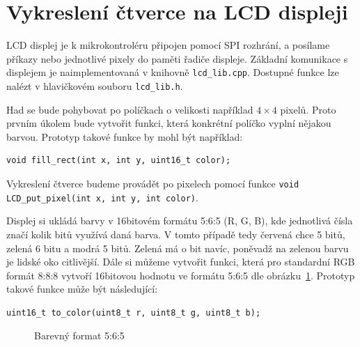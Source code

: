 \documentclass[12pt]{article}
\begin{document}
\section{Vykreslení čtverce na LCD displeji}
LCD displej je k mikrokontroléru připojen pomocí SPI rozhrání, a posílame příkazy nebo jednotlivé pixely do paměti řadiče displeje.
Základní komunikace s displejem je naimplementovaná v knihovně \texttt{lcd\_lib.cpp}.
Dostupné funkce lze nalézt v hlavičkovém souboru \texttt{lcd\_lib.h}.

Had se bude pohybovat po políčkach o velikosti například $4\times4$ pixelů.
Proto prvním úkolem bude vytvořit funkci, která konkrétní políčko vyplní nějakou barvou.
Prototyp takové funkce by mohl být například:
\begin{verbatim}
void fill_rect(int x, int y, uint16_t color);
\end{verbatim}
Vykreslení čtverce budeme provádět po pixelech pomocí funkce \texttt{void LCD_put_pixel(int x, int y, int color)}.

Displej si ukládá barvy v 16bitovém formátu 5:6:5 (R, G, B), kde jednotlivá čísla značí kolik bitů využívá daná barva.
V tomto případě tedy červená chce 5 bitů, zelená 6 bitu a modrá 5 bitů.
Zelená má o bit navíc, poněvadž na zelenou barvu je lidské oko citlivější.
Dále si můžeme vytvořit funkci, která  pro standardní RGB formát 8:8:8 vytvoří 16bitovou hodnotu ve formátu 5:6:5 dle obrázku~\ref{fig:rgb565}.
Prototyp takové funkce může být následující:
\begin{verbatim}
uint16_t to_color(uint8_t r, uint8_t g, uint8_t b);
\end{verbatim}

\begin{figure}[ht]
	\centering
	\caption{Barevný format 5:6:5}
  \label{fig:rgb565}
\end{figure}
\end{document}
